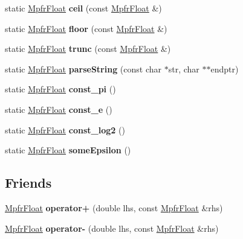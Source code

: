 \begin{DoxyCompactItemize}
\item 
\mbox{\label{class_mpfr_float_a14b04dcea959cdad4a849e1bddf5bc1d}} 
static \hyperlink{class_mpfr_float}{Mpfr\+Float} {\bfseries ceil} (const \hyperlink{class_mpfr_float}{Mpfr\+Float} \&)
\item 
\mbox{\label{class_mpfr_float_a79b5254d0e97ad5bb6e23342fc98c7d4}} 
static \hyperlink{class_mpfr_float}{Mpfr\+Float} {\bfseries floor} (const \hyperlink{class_mpfr_float}{Mpfr\+Float} \&)
\item 
\mbox{\label{class_mpfr_float_affbe1e67da1e57258411bdca42e52acc}} 
static \hyperlink{class_mpfr_float}{Mpfr\+Float} {\bfseries trunc} (const \hyperlink{class_mpfr_float}{Mpfr\+Float} \&)
\item 
\mbox{\label{class_mpfr_float_a3a9433e0eee8c99d3b3242cec33215be}} 
static \hyperlink{class_mpfr_float}{Mpfr\+Float} {\bfseries parse\+String} (const char $\ast$str, char $\ast$$\ast$endptr)
\item 
\mbox{\label{class_mpfr_float_a1d7325b12f2746fe76e8a4d071290d32}} 
static \hyperlink{class_mpfr_float}{Mpfr\+Float} {\bfseries const\+\_\+pi} ()
\item 
\mbox{\label{class_mpfr_float_a8a2736980d7c769f20d465e2bd07b5ad}} 
static \hyperlink{class_mpfr_float}{Mpfr\+Float} {\bfseries const\+\_\+e} ()
\item 
\mbox{\label{class_mpfr_float_a4e7ab537851e889df053836a0f638e01}} 
static \hyperlink{class_mpfr_float}{Mpfr\+Float} {\bfseries const\+\_\+log2} ()
\item 
\mbox{\label{class_mpfr_float_a441261caadbe7f6485080837b5db7397}} 
static \hyperlink{class_mpfr_float}{Mpfr\+Float} {\bfseries some\+Epsilon} ()
\end{DoxyCompactItemize}
\subsection*{Friends}
\begin{DoxyCompactItemize}
\item 
\mbox{\label{class_mpfr_float_a7214b4a42cb61f7e76a24d2dadbf6c50}} 
\hyperlink{class_mpfr_float}{Mpfr\+Float} {\bfseries operator+} (double lhs, const \hyperlink{class_mpfr_float}{Mpfr\+Float} \&rhs)
\item 
\mbox{\label{class_mpfr_float_a08e7341c10d54073d1e47b0626118776}} 
\hyperlink{class_mpfr_float}{Mpfr\+Float} {\bfseries operator-\/} (double lhs, const \hyperlink{class_mpfr_float}{Mpfr\+Float} \&rhs)
\end{DoxyCompactItemize}


